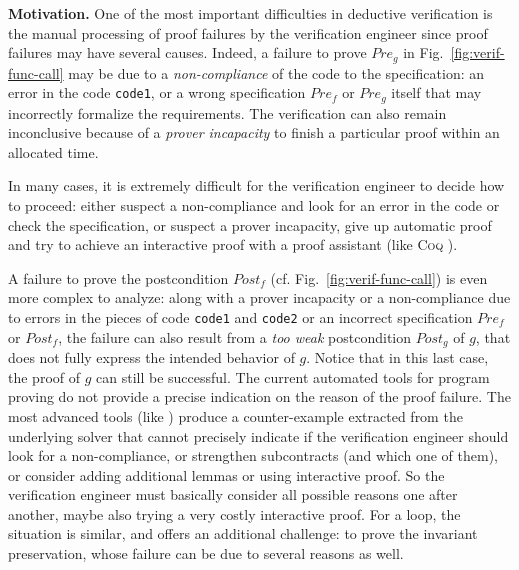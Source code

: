 \documentclass[web]{frama-c-book}
\begin{document}
\textbf{Motivation.} 
One of the most important difficulties in deductive verification is the manual
processing of proof failures 
by the verification engineer since proof failures may have several
causes. 
Indeed, a failure to prove $\textit{Pre}_g$ in Fig.~\ref{fig:verif-func-call} may be due to
a \emph{non-compliance} of the code to the specification:
an error in the code \lstinline'code1', or a 
wrong specification $\textit{Pre}_f$ or $\textit{Pre}_g$ itself
that may incorrectly formalize the requirements.
The verification can also remain inconclusive because of 
a \emph{prover incapacity} to finish
a particular proof within an allocated time. 

In many cases, it is extremely difficult for the verification engineer 
to decide how to proceed: 
either suspect a non-compliance and look for an error in the code or check the specification, 
or suspect a prover incapacity, give up automatic proof and try to achieve an
interactive proof with a proof assistant (like \textsc{Coq} \cite{coq}).

A failure to prove the postcondition $\textit{Post}_f$ %
(cf. Fig.~\ref{fig:verif-func-call}) is even more complex to analyze: along with a
prover incapacity or a non-compliance due to errors in the pieces of code
\lstinline'code1' and \lstinline'code2' or an incorrect
specification $\textit{Pre}_f$ or $\textit{Post}_f$, the failure can
also result from a \textit{too weak} postcondition $\textit{Post}_g$ of $g$, that
does not fully express the intended behavior of $g$. Notice that in this last case, the proof of $g$ can
still be successful. 
The current automated tools for program proving
do not provide a precise 
indication on the reason of the proof failure.
The most advanced tools (like  \cite{Leino/FIDE14}) produce a
counter-example extracted from the underlying solver
that cannot precisely indicate if the verification engineer should look for 
a non-compliance,
or strengthen subcontracts (and which one of them), 
or consider adding additional lemmas or using interactive proof.
So the verification engineer must basically consider all possible reasons one
after another, maybe also trying a very costly interactive proof.
For a loop, %
the situation is similar,
and offers an additional challenge:
to prove the invariant preservation, whose failure 
can be due to several reasons as well.
\end{document}
